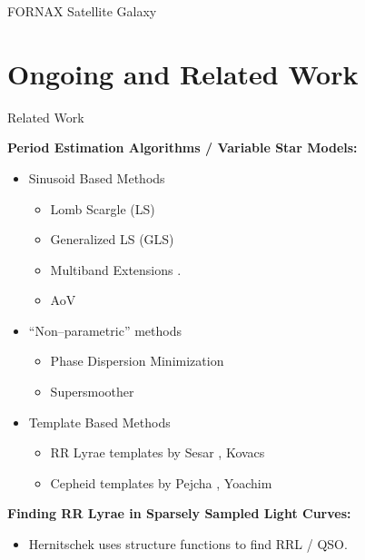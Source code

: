 \documentclass[12pt]{beamer}
\begin{document}
\begin{frame}{FORNAX Satellite Galaxy}

\end{frame}



\section{Ongoing and Related Work}

\begin{frame}{Related Work}

\textbf{Period Estimation Algorithms / Variable Star Models:}
\begin{itemize}
\item Sinusoid Based Methods
\begin{itemize}
\item Lomb Scargle (LS) \cite{lomb1976least,scargle1982studies}
\item Generalized LS (GLS) \cite{zechmeister2009generalised}
\item Multiband Extensions \cite{vanderplas2015periodograms,long2014estimating}.
\item AoV \cite{schwarzenberg1996fast}
\end{itemize}
\item ``Non--parametric'' methods
\begin{itemize}
\item Phase Dispersion Minimization \cite{stellingwerf1978period}
\item Supersmoother \cite{sesar2010light}
\end{itemize}
\item Template Based Methods
\begin{itemize}
\item RR Lyrae templates by Sesar \cite{sesar2010light}, Kovacs \cite{kovacs2007computation}
\item Cepheid templates by Pejcha \cite{pejcha2012global}, Yoachim \cite{yoachim2009panoply}
\end{itemize}
\end{itemize}

\vspace{.1in}

\textbf{Finding RR Lyrae in Sparsely Sampled Light Curves:}
\begin{itemize}
\item Hernitschek \cite{hernitschek2016finding} uses structure functions to find RRL / QSO.
\end{itemize}


\end{frame}
\end{document}
